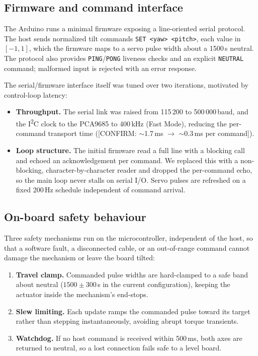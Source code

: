 \subsection{Firmware and command interface}
\label{sec:elec-firmware}

The Arduino runs a minimal firmware exposing a line-oriented serial protocol.
The host sends normalized tilt commands \texttt{SET <yaw> <pitch>}, each value
in $[-1, 1]$, which the firmware maps to a servo pulse width about a
1500\,\textmu s neutral. The protocol also provides \texttt{PING}/\texttt{PONG}
liveness checks and an explicit \texttt{NEUTRAL} command; malformed input is
rejected with an error response.

The serial/firmware interface itself was tuned over two iterations, motivated
by control-loop latency:

\begin{itemize}
  \item \textbf{Throughput.} The serial link was raised from 115\,200 to
    500\,000\,baud, and the I\textsuperscript{2}C clock to the PCA9685 to
    400\,kHz (Fast Mode), reducing the per-command transport time
    ([CONFIRM: $\sim$1.7\,ms $\rightarrow$ $\sim$0.3\,ms per command]).
  \item \textbf{Loop structure.} The initial firmware read a full line with a
    blocking call and echoed an acknowledgement per command. We replaced this
    with a non-blocking, character-by-character reader and dropped the
    per-command echo, so the main loop never stalls on serial I/O. Servo pulses
    are refreshed on a fixed 200\,Hz schedule independent of command arrival.
\end{itemize}

\subsection{On-board safety behaviour}
\label{sec:elec-safety}

Three safety mechanisms run on the microcontroller, independent of the host, so
that a software fault, a disconnected cable, or an out-of-range command cannot
damage the mechanism or leave the board tilted:

\begin{enumerate}
  \item \textbf{Travel clamp.} Commanded pulse widths are hard-clamped to a
    safe band about neutral ($1500\pm300$\,\textmu s in the current
    configuration), keeping the actuator inside the mechanism's end-stops.
  \item \textbf{Slew limiting.} Each update ramps the commanded pulse toward
    its target rather than stepping instantaneously, avoiding abrupt torque
    transients.
  \item \textbf{Watchdog.} If no host command is received within 500\,ms, both
    axes are returned to neutral, so a lost connection fails safe to a level
    board.
\end{enumerate}


